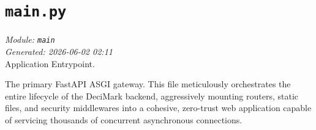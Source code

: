 
\section{\texttt{main.py}}
\textit{Module: \texttt{main}} \\
\textit{Generated: 2026-06-02 02:11} \\

Application Entrypoint.

The primary FastAPI ASGI gateway. This file meticulously orchestrates
the entire lifecycle of the DeciMark backend, aggressively mounting
routers, static files, and security middlewares into a cohesive,
zero-trust web application capable of servicing thousands of concurrent
asynchronous connections.
